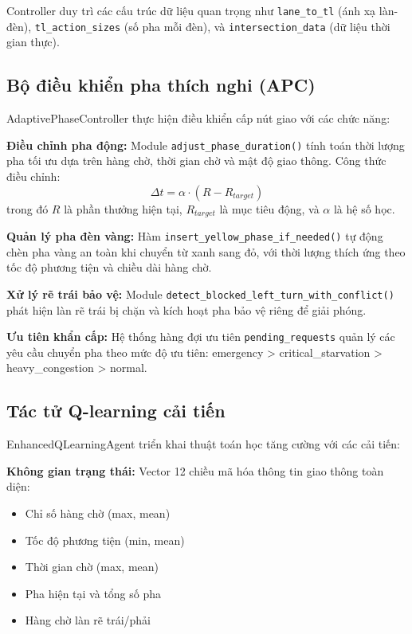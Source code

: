 Controller duy trì các cấu trúc dữ liệu quan trọng như \texttt{lane\_to\_tl} (ánh xạ làn-đèn), \texttt{tl\_action\_sizes} (số pha mỗi đèn), và \texttt{intersection\_data} (dữ liệu thời gian thực).

\subsection{Bộ điều khiển pha thích nghi (APC)}

AdaptivePhaseController thực hiện điều khiển cấp nút giao với các chức năng:

\textbf{Điều chỉnh pha động:} Module \texttt{adjust\_phase\_duration()} tính toán thời lượng pha tối ưu dựa trên hàng chờ, thời gian chờ và mật độ giao thông. Công thức điều chỉnh:
\[
\Delta t = \alpha \cdot (R - R_{target})
\]
trong đó $R$ là phần thưởng hiện tại, $R_{target}$ là mục tiêu động, và $\alpha$ là hệ số học.

\textbf{Quản lý pha đèn vàng:} Hàm \texttt{insert\_yellow\_phase\_if\_needed()} tự động chèn pha vàng an toàn khi chuyển từ xanh sang đỏ, với thời lượng thích ứng theo tốc độ phương tiện và chiều dài hàng chờ.

\textbf{Xử lý rẽ trái bảo vệ:} Module \texttt{detect\_blocked\_left\_turn\_with\_conflict()} phát hiện làn rẽ trái bị chặn và kích hoạt pha bảo vệ riêng để giải phóng.

\textbf{Ưu tiên khẩn cấp:} Hệ thống hàng đợi ưu tiên \texttt{pending\_requests} quản lý các yêu cầu chuyển pha theo mức độ ưu tiên: emergency > critical\_starvation > heavy\_congestion > normal.

\subsection{Tác tử Q-learning cải tiến}

EnhancedQLearningAgent triển khai thuật toán học tăng cường với các cải tiến:

\textbf{Không gian trạng thái:} Vector 12 chiều mã hóa thông tin giao thông toàn diện:
\begin{itemize}
    \item Chỉ số hàng chờ (max, mean)
    \item Tốc độ phương tiện (min, mean)  
    \item Thời gian chờ (max, mean)
    \item Pha hiện tại và tổng số pha
    \item Hàng chờ làn rẽ trái/phải
\end{itemize}

